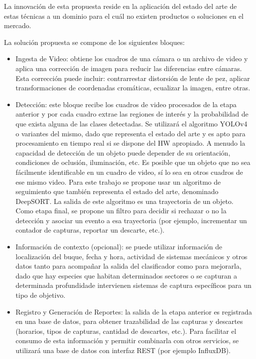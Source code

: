 \documentclass[11pt]{charter}
\begin{document}
La innovación de esta propuesta reside en la aplicación del estado del arte de estas técnicas a un dominio para el cuál no existen productos o soluciones en el mercado.

La solución propuesta se compone de los siguientes bloques:

\begin{itemize}
\item Ingesta de Video: obtiene los cuadros de una cámara o un archivo de video y aplica una corrección de imagen para reducir las diferencias entre cámaras. Esta corrección puede incluir: contrarrestar distorsión de lente de pez, aplicar transformaciones de coordenadas cromáticas, ecualizar la imagen, entre otras.

\item Detección: este bloque recibe los cuadros de video procesados de la etapa anterior y por cada cuadro extrae las regiones de interés y la probabilidad de que exista alguna de las clases detectadas. Se utilizará el algoritmo YOLOv4 o variantes del mismo, dado que representa el estado del arte y es apto para procesamiento en tiempo real si se dispone del HW apropiado. A menudo la capacidad de detección de un objeto puede depender de su orientación, condiciones de oclusión, iluminación, etc. Es posible que un objeto que no sea fácilmente identificable en un cuadro de video, sí lo sea en otros cuadros de ese mismo video. Para este trabajo se propone usar un algoritmo de seguimiento que también representa el estado del arte, denominado DeepSORT. La salida de este algoritmo es una trayectoria de un objeto. Como etapa final, se propone un filtro para decidir si rechazar o no la detección y asociar un evento a esa trayectoria (por ejemplo, incrementar un contador de capturas, reportar un descarte, etc.).

\item Información de contexto (opcional): se puede utilizar información de localización del buque, fecha y hora, actividad de sistemas mecánicos y otros datos tanto para acompañar la salida del clasificador como para mejorarla, dado que hay especies que habitan determinados sectores o se capturan a determinada profundidade intervienen sistemas de captura específicos para un tipo de objetivo.

\item Registro y Generación de Reportes: la salida de la etapa anterior es registrada en una base de datos, para obtener trazabilidad de las capturas y descartes (horarios, tipos de capturas, cantidad de descartes, etc.). Para facilitar el consumo de esta información y permitir combinarla con otros servicios, se utilizará una base de datos con interfaz REST (por ejemplo InfluxDB).
\end{itemize}
\end{document}
